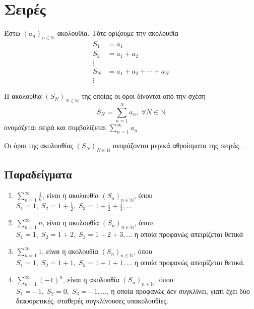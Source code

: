 \documentclass[a4paper,table]{report}
\begin{document}
\chapter{Σειρές}



\begin{mybox1}
\begin{dfn}
Έστω $ {(a_{n})}_{n \in \mathbb{N}}$ ακολουθία. Τότε ορίζουμε την ακολουϑία 
\begin{align*}
    S_{1} &= a_{1} \\
    S_{2} &= a_{1}+ a_{2} \\
    \vdots \\
    S_{N} &= a_{1}+ a_{2}+ \cdots + a_{N} \\
    \vdots 
\end{align*}

Η ακολουθία $ {(S_{N})}_{N \in \mathbb{N}} $ της οποίας οι όροι δίνονται από την 
σχέση \[ S_{N} = \sum_{n=1}^{N} a_{n}, \; \forall N \in \mathbb{N} \] ονομάζεται 
\textcolor{Col2}{σειρά} και συμβολίζεται
$
    \sum_{n=1}^{\infty} a_{n} 
$
\end{dfn}
\end{mybox1}

\begin{rem}
Οι όροι της ακολουθίας $ {(S_{N})}_{N \in \mathbb{N}} $ ονομάζονται 
\textcolor{Col2}{μερικά αθροίσματα} της σειράς.
\end{rem}

\section{Παραδείγματα}

\begin{enumerate}
    \item $ \sum_{n=1}^{\infty} \frac{1}{n} $, είναι η ακολουθία 
        $ {(S_{n})}_{n \in \mathbb{N}} $, όπου $ S_{1}=1, \; S_{2}=1+ \frac{1}{2}, \; 
        S_{3}= 1 + \frac{1}{2} + \frac{1}{3}, \ldots  $

    \item $ \sum_{n=1}^{\infty} n  $, είναι η ακολουθία ${(S_{n})}_{n \in \mathbb{N}}$,
        όπου $ S_{1}=1, \; S_{2}=1+2, \; S_{3}=1+2+3, \ldots $ η οποία προφανώς 
        απειρίζεται θετικά

    \item $ \sum_{n=1}^{\infty} 1  $, είναι η ακολουθία ${(S_{n})}_{n \in \mathbb{N}}$,
        όπου $ S_{1}=1, \; S_{2}=1+1, \; S_{3}=1+1+1, \ldots $ η οποία προφανώς 
        απειρίζεται θετικά.

    \item $ \sum_{n=1}^{\infty} {(-1)}^{n}  $, είναι η ακολουθία 
        $ {(S_{n})}_{n \in \mathbb{N}} $, όπου $ S_{1}=-1, \; S_{2}=0, \; S_{3}=-1, 
        \ldots $, η οποία προφανώς δεν συγκλίνει, γιατί έχει δύο διαφορετικές, σταθερές 
        συγκλίνουσες υπακολουθίες.
\end{enumerate}
\end{document}
